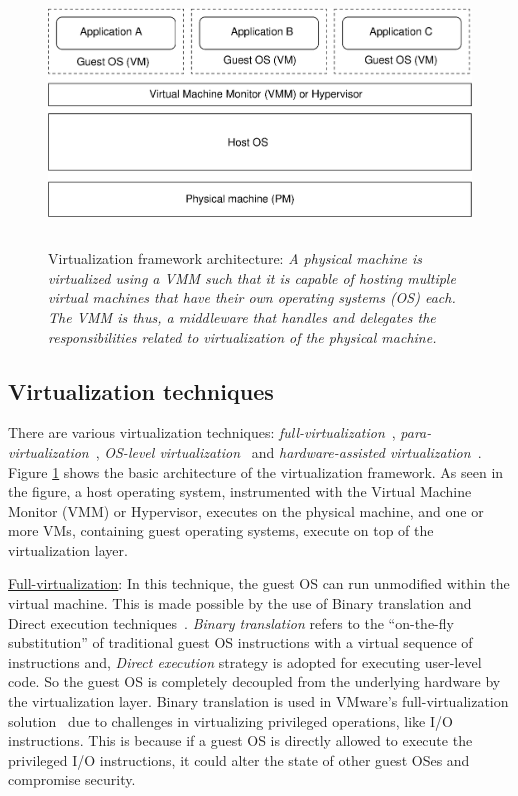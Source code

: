 \begin{figure}[t]
\begin{center}
\includegraphics[height=7cm, width=14cm]{first-aps-figures/virtualization-arch.eps}
\caption{Virtualization framework architecture: \textit{A physical machine is 
virtualized using a VMM such that it is capable of hosting multiple virtual 
machines that have their own operating systems (OS) each. The VMM is thus, a
middleware that handles and delegates the responsibilities related to virtualization
of the physical machine.}} 
\label{virtualization-arch}
\end{center}
\end{figure}

\subsection{Virtualization techniques}
\label{virtualization-tech}
There are various virtualization techniques: \textit{full-virtualization}~\cite{vmware-paravirtualization},
\textit{para-virtualization}~\cite{xen}, \textit{OS-level
virtualization}~\cite{quantifying-the-performance-isolation-properties}
and \textit{hardware-assisted virtualization}~\cite{kvm}.
Figure \ref{virtualization-arch} shows the basic architecture of the
virtualization framework. As seen in the figure, a host operating
system, instrumented with the 
Virtual Machine Monitor (VMM) or Hypervisor,
executes on the physical machine, 
and one or more VMs, containing guest operating systems, execute on top 
of the virtualization layer.


\underline{Full-virtualization}: In 
this technique, the guest 
OS can run unmodified within the virtual machine. This is made 
possible by the use of Binary translation and
Direct execution techniques~\cite{vmware-paravirtualization}. 
\textit{Binary translation} refers to the ``on-the-fly substitution'' 
of traditional guest OS instructions with a virtual sequence of 
instructions and, \textit{Direct execution}
strategy is adopted for executing user-level code. So the
guest OS is completely decoupled from the underlying hardware by the
virtualization layer.
Binary translation is used in VMware's full-virtualization 
solution~\cite{vmware-paravirtualization} due to challenges
in virtualizing privileged operations, like I/O instructions. This is
because if a guest OS is directly allowed to execute the privileged I/O
instructions, it could alter the
state of other guest OSes and compromise security. 

